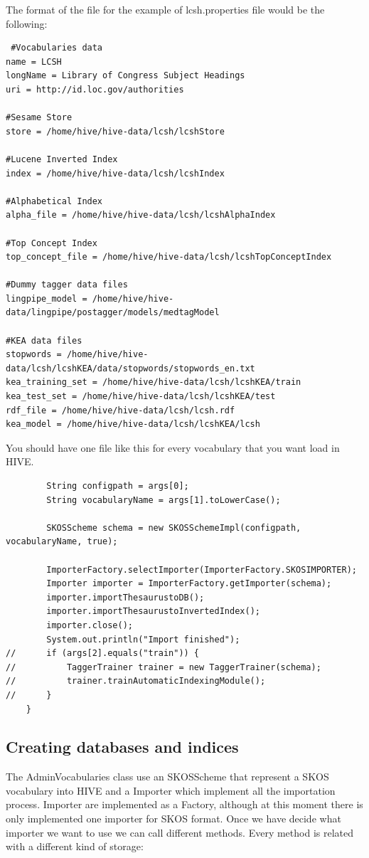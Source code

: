 The format of the file for the example of lcsh.properties file would be the following:

\begin{verbatim}
 #Vocabularies data
name = LCSH
longName = Library of Congress Subject Headings
uri = http://id.loc.gov/authorities

#Sesame Store
store = /home/hive/hive-data/lcsh/lcshStore

#Lucene Inverted Index
index = /home/hive/hive-data/lcsh/lcshIndex

#Alphabetical Index
alpha_file = /home/hive/hive-data/lcsh/lcshAlphaIndex

#Top Concept Index
top_concept_file = /home/hive/hive-data/lcsh/lcshTopConceptIndex

#Dummy tagger data files
lingpipe_model = /home/hive/hive-data/lingpipe/postagger/models/medtagModel

#KEA data files
stopwords = /home/hive/hive-data/lcsh/lcshKEA/data/stopwords/stopwords_en.txt
kea_training_set = /home/hive/hive-data/lcsh/lcshKEA/train
kea_test_set = /home/hive/hive-data/lcsh/lcshKEA/test
rdf_file = /home/hive/hive-data/lcsh/lcsh.rdf
kea_model = /home/hive/hive-data/lcsh/lcshKEA/lcsh
\end{verbatim}

You should have one file like this for every vocabulary that you want load in HIVE.

\begin{verbatim}
 		String configpath = args[0];
		String vocabularyName = args[1].toLowerCase();

		SKOSScheme schema = new SKOSSchemeImpl(configpath, vocabularyName, true);

		ImporterFactory.selectImporter(ImporterFactory.SKOSIMPORTER);
		Importer importer = ImporterFactory.getImporter(schema);
		importer.importThesaurustoDB();
		importer.importThesaurustoInvertedIndex();
		importer.close();
		System.out.println("Import finished");
//		if (args[2].equals("train")) {
//			TaggerTrainer trainer = new TaggerTrainer(schema);
//			trainer.trainAutomaticIndexingModule();
// 		}
	}
\end{verbatim}

\subsection{Creating databases and indices}

The AdminVocabularies class use an SKOSScheme that represent a SKOS vocabulary into HIVE and a Importer which implement all the importation 
process. Importer are implemented as a Factory, although at this moment there is only implemented one importer for SKOS format. 
Once we have decide what importer we want to use we can call different methods. Every method is related with a different kind of storage:

